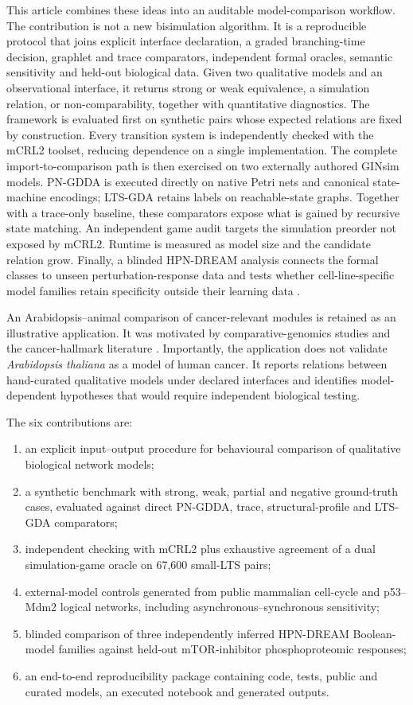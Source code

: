 \documentclass[pdflatex,sn-mathphys-ay]{sn-jnl}
\theoremstyle{definition}
\newcommand{\tas}{\textit{Arabidopsis thaliana}}
\begin{document}
This article combines these ideas into an auditable model-comparison workflow.
The contribution is not a new bisimulation algorithm. It is a reproducible
protocol that joins explicit interface declaration, a graded branching-time
decision, graphlet and trace comparators, independent formal oracles, semantic
sensitivity and held-out biological data. Given two qualitative models and an
observational interface, it returns strong or weak equivalence, a simulation
relation, or non-comparability, together with quantitative diagnostics. The
framework is evaluated first
on synthetic pairs whose expected relations are fixed by construction. Every
transition system is independently checked with the mCRL2 toolset, reducing
dependence on a single implementation. The complete import-to-comparison path is
then exercised on two externally authored GINsim models. PN-GDDA is executed
directly on native Petri nets and canonical state-machine encodings; LTS-GDA
retains labels on reachable-state graphs. Together with a trace-only baseline,
these comparators expose what is gained by recursive state matching. An independent game audit
targets the simulation preorder not exposed by mCRL2. Runtime is measured as
model size and the candidate relation grow. Finally, a blinded HPN-DREAM analysis connects the formal classes
to unseen perturbation-response data and tests whether cell-line-specific model
families retain specificity outside their learning data \citep{Hill2016,
Razzaq2018}.

An Arabidopsis--animal comparison of cancer-relevant modules is retained as an
illustrative application. It was motivated by comparative-genomics studies
\citep{Quimbaya2012,ClavijoBuritica2023} and the cancer-hallmark literature
\citep{Hanahan2011,Hanahan2022}. Importantly, the application does not validate
\tas{} as a model of human cancer. It reports relations between hand-curated
qualitative models under declared interfaces and identifies model-dependent
hypotheses that would require independent biological testing.

The six contributions are:
\begin{enumerate}
\item an explicit input--output procedure for behavioural comparison of
qualitative biological network models;
\item a synthetic benchmark with strong, weak, partial and negative ground-truth
cases, evaluated against direct PN-GDDA, trace, structural-profile and LTS-GDA
comparators;
\item independent checking with mCRL2 plus exhaustive agreement of a dual
simulation-game oracle on 67,600 small-LTS pairs;
\item external-model controls generated from public mammalian cell-cycle and
p53--Mdm2 logical networks, including asynchronous--synchronous sensitivity;
\item blinded comparison of three independently inferred HPN-DREAM Boolean-model
families against held-out mTOR-inhibitor phosphoproteomic responses;
\item an end-to-end reproducibility package containing code, tests, public and
curated models, an executed notebook and generated outputs.
\end{enumerate}
\end{document}
